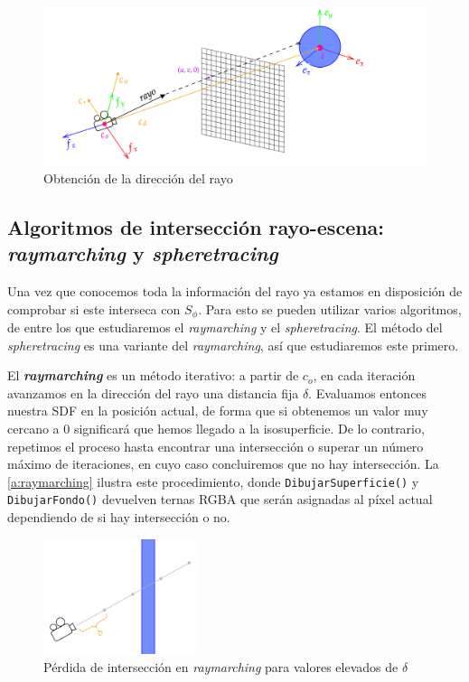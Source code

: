 \begin{figure}[ht!]
    \centering
    \includegraphics[width=\textwidth]{Plantilla-TFG-master/img/raydir_fix.png}
    \caption{Obtención de la dirección del rayo}
    \label{fig:raydir}
\end{figure}

\subsection{Algoritmos de intersección rayo-escena: \textit{raymarching} y \textit{spheretracing}}\label{sec:tracing}
Una vez que conocemos toda la información del rayo ya estamos en disposición de comprobar si este interseca con $S_{\phi}$. Para esto se pueden utilizar varios algoritmos, de entre los que estudiaremos el \textit{raymarching} y el \textit{spheretracing}. El método del \textit{spheretracing} es una variante del \textit{raymarching}, así que estudiaremos este primero.\newline

El \textbf{\textit{raymarching}} es un método iterativo: a partir de $c_o$, en cada iteración avanzamos en la dirección del rayo una distancia fija $\delta$. Evaluamos entonces nuestra SDF en la posición actual, de forma que si obtenemos un valor muy cercano a $0$ significará que hemos llegado a la isosuperficie. De lo contrario, repetimos el proceso hasta encontrar una intersección o superar un número máximo de iteraciones, en cuyo caso concluiremos que no hay intersección. La \autoref{a:raymarching} ilustra este procedimiento, donde \texttt{DibujarSuperficie()} y \texttt{DibujarFondo()} devuelven ternas RGBA que serán asignadas al píxel actual dependiendo de si hay intersección o no.\newline

\begin{figure}[ht!]
    \centering
    \includegraphics[width=0.4\textwidth]{Plantilla-TFG-master/img/miss.png}
    \caption{Pérdida de intersección en \textit{raymarching} para valores elevados de $\delta$}
    \label{fig:missInter}
\end{figure}


